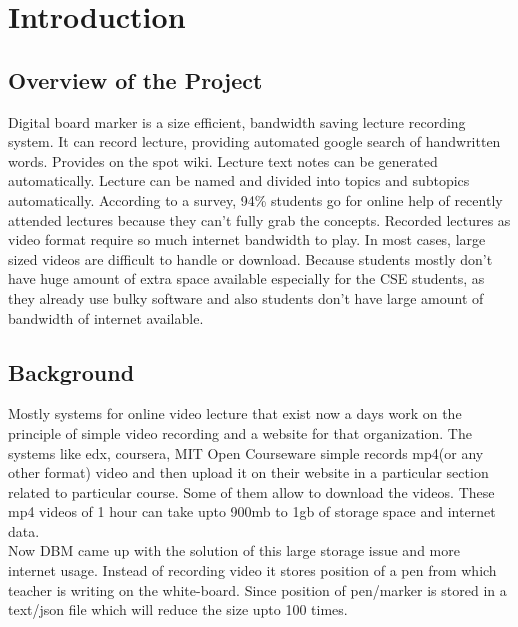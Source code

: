 
\chapter{Introduction} %
\label{Chapter1}
\section{Overview of the Project}
Digital board marker is a size efficient, bandwidth saving lecture recording system. It can record lecture, providing automated google search of handwritten words. Provides on the spot wiki. Lecture text notes can be generated automatically. Lecture can be named and divided into topics and subtopics automatically. According to a survey, 94\% students go for online help of recently attended lectures because they can't fully grab the concepts. Recorded lectures as video format require so much internet bandwidth to play. In most cases, large sized videos are difficult to handle or download. Because students mostly don't have huge amount of extra space available especially for the CSE students, as they already use bulky software and also students don't have large amount of bandwidth of internet available.
\bigskip

\section{Background}
Mostly systems for online video lecture that exist now a days work on the principle of simple video recording and a website for that organization. The systems like edx, coursera, MIT Open Courseware simple records mp4(or any other format) video and then upload it on their website in a particular section related to particular course. Some of them allow to download the videos. These mp4 videos of 1 hour can take upto 900mb to 1gb of storage space and internet data.\\
Now DBM came up with the solution of this large storage issue and more internet usage. Instead of recording video it stores position of a pen from which teacher is writing on the white-board. Since position of pen/marker is stored in a text/json file which will reduce the size upto 100 times. 

\bigskip

